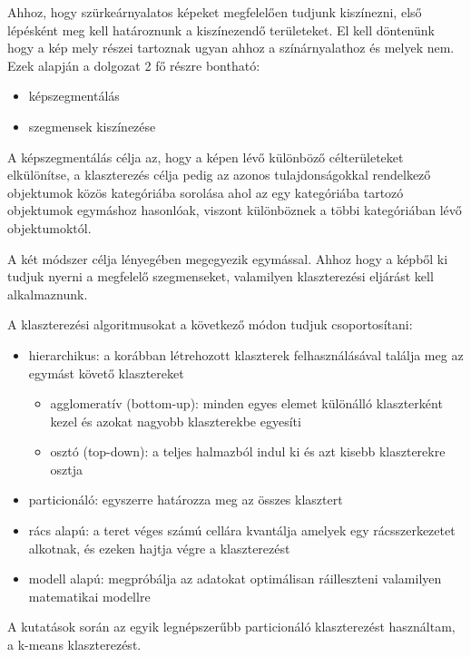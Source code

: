 
Ahhoz, hogy szürkeárnyalatos képeket megfelelően tudjunk kiszínezni, első lépésként meg kell határoznunk a kiszínezendő területeket. El kell döntenünk hogy a kép mely részei tartoznak ugyan ahhoz a színárnyalathoz és melyek nem. Ezek alapján a dolgozat 2 fő részre bontható:
\begin{itemize}
\item képszegmentálás
\item szegmensek kiszínezése
\end{itemize}

A képszegmentálás célja az, hogy a képen lévő különböző célterületeket elkülönítse, a klaszterezés célja pedig az azonos tulajdonságokkal rendelkező objektumok közös kategóriába sorolása ahol az egy kategóriába tartozó objektumok egymáshoz hasonlóak, viszont különböznek a többi kategóriában lévő objektumoktól.

A két módszer célja lényegében megegyezik egymással. Ahhoz hogy a képből ki tudjuk nyerni a megfelelő szegmenseket, valamilyen klaszterezési eljárást kell alkalmaznunk.

A klaszterezési algoritmusokat a következő módon tudjuk csoportosítani\cite{clustering}:
\begin{itemize}
\item hierarchikus: a korábban létrehozott klaszterek felhasználásával találja meg az egymást követő klasztereket
    \begin{itemize}
    \item agglomeratív (bottom-up): minden egyes elemet különálló klaszterként kezel és azokat nagyobb klaszterekbe egyesíti
    \item osztó (top-down): a teljes halmazból indul ki és azt kisebb klaszterekre osztja
    \end{itemize}
\item particionáló: egyszerre határozza meg az összes klasztert
\item rács alapú: a teret véges számú cellára kvantálja amelyek egy rácsszerkezetet alkotnak, és ezeken hajtja végre a klaszterezést
\item modell alapú: megpróbálja az adatokat optimálisan ráilleszteni valamilyen matematikai modellre
\end{itemize}

A kutatások során az egyik legnépszerűbb particionáló klaszterezést használtam, a k-means klaszterezést.


